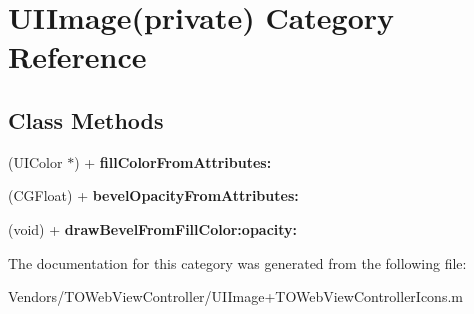 \hypertarget{category_u_i_image_07private_08}{}\section{U\+I\+Image(private) Category Reference}
\label{category_u_i_image_07private_08}
\subsection*{Class Methods}
\begin{DoxyCompactItemize}
\item 
\hypertarget{category_u_i_image_07private_08_a3bc42011d855dab80f68b5838014a8c8}{}(U\+I\+Color $\ast$) + {\bfseries fill\+Color\+From\+Attributes\+:}\label{category_u_i_image_07private_08_a3bc42011d855dab80f68b5838014a8c8}

\item 
\hypertarget{category_u_i_image_07private_08_a326a16d955edc7d802d024a9dbdcd556}{}(C\+G\+Float) + {\bfseries bevel\+Opacity\+From\+Attributes\+:}\label{category_u_i_image_07private_08_a326a16d955edc7d802d024a9dbdcd556}

\item 
\hypertarget{category_u_i_image_07private_08_a9da05662d6e3cf399a749c5b62968de7}{}(void) + {\bfseries draw\+Bevel\+From\+Fill\+Color\+:opacity\+:}\label{category_u_i_image_07private_08_a9da05662d6e3cf399a749c5b62968de7}

\end{DoxyCompactItemize}


The documentation for this category was generated from the following file\+:\begin{DoxyCompactItemize}
\item 
Vendors/\+T\+O\+Web\+View\+Controller/U\+I\+Image+\+T\+O\+Web\+View\+Controller\+Icons.\+m\end{DoxyCompactItemize}
